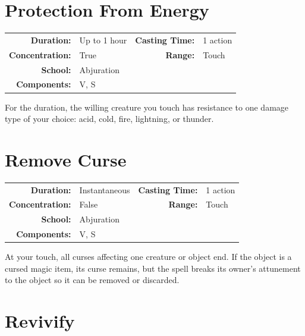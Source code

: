 \documentclass[12pt,showtrims]{memoir}
\begin{document}
\newpage
\section*{Protection From Energy}

{
\small\centering\vspace{-6pt}
\begin{tabular}{rlrl}
\toprule

\textbf{Duration:} & Up to 1 hour &
\textbf{Casting Time:} & 1 action \\
\textbf{Concentration:} & True &
\textbf{Range:} & Touch \\
\textbf{School:} & Abjuration \\
\textbf{Components:} & \multicolumn{3}{p{0.7\textwidth}}{V, S}\\

\bottomrule
\end{tabular}
}

\vspace{1\baselineskip}\noindent For the duration, the willing creature you touch has resistance to one damage type of your choice: acid, cold, fire, lightning, or thunder.

\newpage
\section*{Remove Curse}

{
\small\centering\vspace{-6pt}
\begin{tabular}{rlrl}
\toprule

\textbf{Duration:} & Instantaneous &
\textbf{Casting Time:} & 1 action \\
\textbf{Concentration:} & False &
\textbf{Range:} & Touch \\
\textbf{School:} & Abjuration \\
\textbf{Components:} & \multicolumn{3}{p{0.7\textwidth}}{V, S}\\

\bottomrule
\end{tabular}
}

\vspace{1\baselineskip}\noindent At your touch, all curses affecting one creature or object end. If the object is a cursed magic item, its curse remains, but the spell breaks its owner's attunement to the object so it can be removed or discarded.

\newpage
\section*{Revivify}
\end{document}
